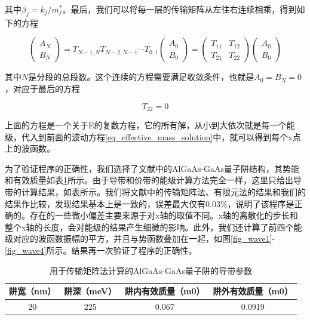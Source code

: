\documentclass{ZJUthesis}
\begin{document}
其中$\beta_j = k_j/m^*_j$。最后，我们可以将每一层的传输矩阵从左往右连续相乘，得到如下的方程

\begin{equation}
    \label{eq_tmm_serial}
    \begin{pmatrix} A_{N} \\ B_{N} \end{pmatrix} = T_{N-1,N}T_{N-2,N-1}\cdots T_{0,1} \begin{pmatrix} A_{0} \\ B_{0} \end{pmatrix} =  \begin{pmatrix} T_{11} & T_{12} \\ T_{21} & T_{22} \end{pmatrix} \begin{pmatrix} A_{0} \\ B_{0} \end{pmatrix}
\end{equation}

其中$N$是分段的总段数。这个连续的方程需要满足收敛条件，也就是$A_0=B_N=0$，对应于最后的方程

\begin{equation}
    \label{eq_t22}
    T_{22}=0
\end{equation}

上面的方程是一个关于E的复数方程，它的所有解，从小到大依次就是每一个能级，代入到前面的波动方程\ref{eq_effective_mass_solution}中，就可以得到每个x点上的波函数。

为了验证程序的正确性，我们选择了文献中的AlGaAs-GaAs量子阱结构\cite{jonsson1990solving}，其势能和有效质量如表\ref{tmm_sample}所示。由于导带和价带的能级计算方法完全一样，这里只给出导带的计算结果，如表所示。我们将文献中的传输矩阵法\cite{jonsson1990solving}、有限元法\cite{nakamura1989finite}的结果和我们的结果作比较，发现结果基本上是一致的，误差最大仅有0.03\%，说明了该程序是正确的。存在的一些微小偏差主要来源于对x轴的取值不同。x轴的离散化的步长和整个x轴的长度，会对能级的结果产生细微的影响。此外，我们还计算了前四个能级对应的波函数振幅的平方，并且与势函数叠加在一起，如图\ref{fig_wave1}-\ref{fig_wave4}所示。结果再一次验证了程序的正确性。

\begin{table}[!t]
    \caption{用于传输矩阵法计算的AlGaAs-GaAs量子阱的导带参数}
    \centering
    \label{tmm_sample}
    \begin{tabular}{cccc}
        \hline
        阱宽（nm） & 阱深（meV） & 阱内有效质量（m0） & 阱外有效质量（m0）\\
        \hline
        20                & 225                 & 0.067                          & 0.0919\\
        \hline
    \end{tabular}
\end{table}
\end{document}
